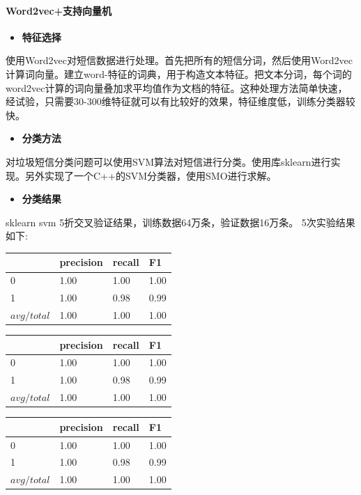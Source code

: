 \paragraph{Word2vec+支持向量机}\label{word2vecux652fux6301ux5411ux91cfux673a}

\begin{itemize}
\tightlist
\item
  \textbf{特征选择}
\end{itemize}

使用Word2vec对短信数据进行处理。首先把所有的短信分词，然后使用Word2vec计算词向量。建立word-特征的词典，用于构造文本特征。把文本分词，每个词的word2vec计算的词向量叠加求平均值作为文档的特征。这种处理方法简单快速，经试验，只需要30-300维特征就可以有比较好的效果，特征维度低，训练分类器较快。

\begin{itemize}
\tightlist
\item
  \textbf{分类方法}
\end{itemize}

对垃圾短信分类问题可以使用SVM算法对短信进行分类。使用库sklearn进行实现。另外实现了一个C++的SVM分类器，使用SMO进行求解。

\begin{itemize}
\tightlist
\item
  \textbf{分类结果}
\end{itemize}

sklearn svm 5折交叉验证结果，训练数据64万条，验证数据16万条。
5次实验结果如下:

\begin{longtable}[]{@{}llll@{}}
\toprule
& precision & recall & F1\tabularnewline
\midrule
\endhead
0 & 1.00 & 1.00 & 1.00\tabularnewline
1 & 1.00 & 0.98 & 0.99\tabularnewline
\(avg/total\) & 1.00 & 1.00 & 1.00\tabularnewline
\bottomrule
\end{longtable}

\begin{longtable}[]{@{}llll@{}}
\toprule
& precision & recall & F1\tabularnewline
\midrule
\endhead
0 & 1.00 & 1.00 & 1.00\tabularnewline
1 & 1.00 & 0.98 & 0.99\tabularnewline
\(avg/total\) & 1.00 & 1.00 & 1.00\tabularnewline
\bottomrule
\end{longtable}

\begin{longtable}[]{@{}llll@{}}
\toprule
& precision & recall & F1\tabularnewline
\midrule
\endhead
0 & 1.00 & 1.00 & 1.00\tabularnewline
1 & 1.00 & 0.98 & 0.99\tabularnewline
\(avg/total\) & 1.00 & 1.00 & 1.00\tabularnewline
\bottomrule
\end{longtable}

